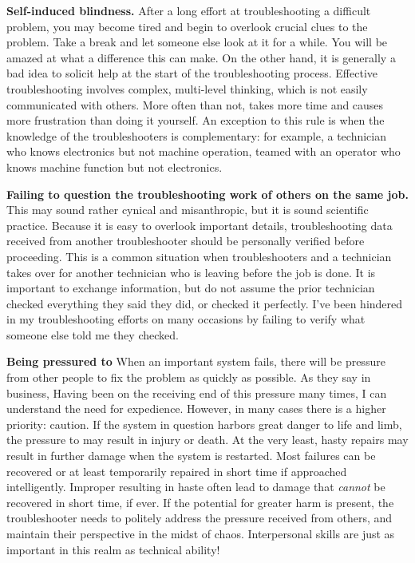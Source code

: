{\bf Self-induced blindness.} After a long effort at troubleshooting a
difficult problem, you may become tired and begin to overlook crucial
clues to the problem. Take a break and let someone else look at it for a
while. You will be amazed at what a difference this can make. On the
other hand, it is generally a bad idea to solicit help at the start of
the troubleshooting process. Effective troubleshooting involves complex,
multi-level thinking, which is not easily communicated with others. More
often than not,  takes more time and
causes more frustration than doing it yourself. An exception to this
rule is when the knowledge of the troubleshooters is complementary: for
example, a technician who knows electronics but not machine operation,
teamed with an operator who knows machine function but not electronics.

{\bf Failing to question the troubleshooting work of others on the same
job.} This may sound rather cynical and misanthropic, but it is sound
scientific practice. Because it is easy to overlook important details,
troubleshooting data received from another troubleshooter should be
personally verified before proceeding. This is a common situation when
troubleshooters  and a technician takes over
for another technician who is leaving before the job is done. It is
important to exchange information, but do not assume the prior
technician checked everything they said they did, or checked it
perfectly. I've been hindered in my troubleshooting efforts on many
occasions by failing to verify what someone else told me they checked.

{\bf Being pressured to } When an important system
fails, there will be pressure from other people to fix the problem as
quickly as possible. As they say in business, 
Having been on the receiving end of this pressure many times, I can
understand the need for expedience. However, in many cases there is a
higher priority: caution. If the system in question harbors great danger
to life and limb, the pressure to  may result in
injury or death. At the very least, hasty repairs may result in further
damage when the system is restarted. Most failures can be recovered or
at least temporarily repaired in short time if approached intelligently.
Improper  resulting in haste often lead to damage that
{\em cannot} be recovered in short time, if ever. If the potential for
greater harm is present, the troubleshooter needs to politely address
the pressure received from others, and maintain their perspective in the
midst of chaos. Interpersonal skills are just as important in this realm
as technical ability!

